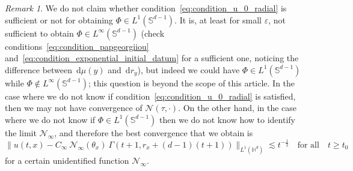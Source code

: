 \documentclass[12pt,longbibliography]{article}
\def\d{\,\mathrm{d}}
\def\d{\,\mathrm{d}}
\theoremstyle{definition}
\theoremstyle{remark}
\newtheorem{rem}[thm]{Remark}
\theoremstyle{example}
\begin{document}
\begin{rem}
	We do not claim whether condition~\eqref{eq:condition_u_0_radial} is sufficient or not for obtaining $\Phi \in L^1(\mathbb{S}^{d-1})$. It is, at least for small $\varepsilon$, not sufficient to obtain $\Phi \in L^\infty(\mathbb{S}^{d-1})$ (check conditions~\eqref{eq:condition_papgeorgiiou} and~\eqref{eq:condition_exponential_initial_datum} for a sufficient one, noticing the difference between $\d \mu(y)$ and $\d r_y$), but indeed we could have $\Phi \in L^1(\mathbb{S}^{d-1})$ while $\Phi \not\in L^\infty(\mathbb{S}^{d-1})$; this question is beyond the scope of this article. In the case where we do not know if condition~\eqref{eq:condition_u_0_radial} is satisfied, then we may not have convergence of $\mathcal{N}(\tau, \cdot)$. On the other hand, in the case where we do not know if $\Phi \in L^1(\mathbb{S}^{d-1})$ then we do not know how to identify the limit $\mathcal{N}_\infty$, and therefore the best convergence that we obtain is
	\[
	\| u(t,x) - C_\infty\ \mathcal{N}_\infty(\theta_x)\ \Gamma(t+1, r_x+(d-1)(t+1)) \|_{L^1(\mathbb{H}^d)}  \lesssim t^{-\frac{1}{2}}\quad \text{for all}\quad t\geq t_0
	\]
	for a certain unidentified function $\mathcal{N}_\infty$.
\end{rem}
%	
\end{document}
